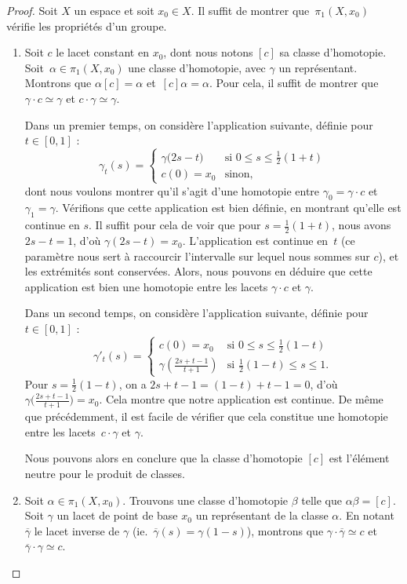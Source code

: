 \begin{proof}
Soit $X$ un espace et soit $x_0\in X$. Il suffit de montrer que~$\pi_1(X,x_0)$ vérifie les propriétés d'un groupe.\begin{enumerate}
    \item Soit $c$ le lacet constant en $x_0$, dont nous notons $[c]$ sa classe d'homotopie. Soit~${\alpha\in\pi_1(X,x_0)}$ une classe d'homotopie, avec $\gamma$ un représentant. Montrons que $\alpha[c]=\alpha$ et~${[c]\alpha=\alpha}$. Pour cela, il suffit de montrer que $\gamma\cdot c\simeq\gamma$ et $c\cdot\gamma\simeq\gamma$.

    Dans un premier temps, on considère l'application suivante, définie pour $t\in[0,1]$ : \[\gamma_t(s)=\left\{\begin{matrix}
    \gamma\big(2s-t\big)&\text{si }0\leq s\leq \frac{1}{2}(1+t)\\ 
    c(0)=x_0&\text{sinon},
    \end{matrix}\right.\]dont nous voulons montrer qu'il s'agit d'une homotopie entre $\gamma_0=\gamma\cdot c$ et $\gamma_1=\gamma$. Vérifions que cette application est bien définie, en montrant qu'elle est continue en $s$. Il suffit pour cela de voir que pour $s=\frac{1}{2}(1+t)$, nous avons $2s-t=1$, d'où $\gamma(2s-t)=x_0$. L'application est continue en~$t$ (ce paramètre nous sert à raccourcir l'intervalle sur lequel nous sommes sur $c$), et les extrémités sont conservées. Alors, nous pouvons en déduire que cette application est bien une homotopie entre les lacets $\gamma\cdot c$ et $\gamma$.

    Dans un second temps, on considère l'application suivante, définie pour $t\in[0,1]$ : \[\gamma'_t(s)=\left\{\begin{matrix}
    c\left(0\right)=x_0&\text{si }0\leq s\leq \frac{1}{2}(1-t)\\ 
    \gamma\left(\frac{2s+t-1}{t+1}\right)&\text{si }\frac{1}{2}(1-t)\leq s\leq 1.
    \end{matrix}\right.\] Pour $s=\frac{1}{2}(1-t)$, on a ${2s+t-1=(1-t)+t-1=0}$, d'où $\gamma\big(\frac{2s+t-1}{t+1}\big)=x_0$. Cela montre que notre application est continue. De même que précédemment, il est facile de vérifier que cela constitue une homotopie entre les lacets~$c\cdot\gamma$ et $\gamma$.

    Nous pouvons alors en conclure que la classe d'homotopie $[c]$ est l'élément neutre pour le produit de classes.
    \item Soit $\alpha\in\pi_1(X,x_0)$. Trouvons une classe d'homotopie $\beta$ telle que $\alpha\beta=[c]$. Soit $\gamma$ un lacet de point de base $x_0$ un représentant de la classe $\alpha$. En notant $\overline{\gamma}$ le lacet inverse de $\gamma$ (ie.~${\overline{\gamma}(s)=\gamma(1-s)}$), montrons que $\gamma\cdot\overline{\gamma}\simeq c$ et $\overline{\gamma}\cdot\gamma\simeq c$.


\end{enumerate}
\end{proof}
